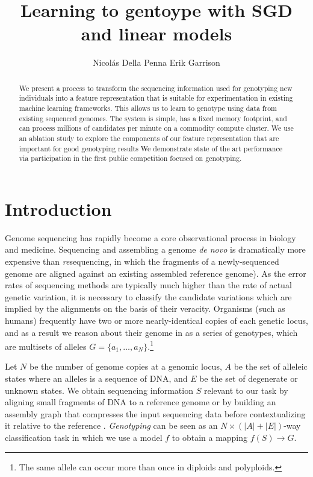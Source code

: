 \documentclass{article}
\title{Learning to gentoype with SGD and linear models}
\author{
Nicol\'as Della Penna
\And
Erik Garrison \\
} %
\begin{document}

\maketitle

\begin{abstract}
  We present a process to transform the sequencing information used for genotyping new individuals into a feature representation that is suitable for experimentation in existing machine learning frameworks.
  This allows us to learn to genotype using data from existing sequenced genomes.
  The system is simple, has a fixed memory footprint, and can process millions of candidates per minute on a commodity compute cluster.
  We use an ablation study to explore the components of our feature representation that are important for good genotyping results
  We demonstrate state of the art performance via participation in the first public competition focused on genotyping.
\end{abstract}

\section{Introduction}



Genome sequencing has rapidly become a core observational process in biology and medicine.
Sequencing and assembling a genome \emph{de novo} is dramatically more expensive than \emph{re}sequencing, in which the fragments of a newly-sequenced genome are aligned against an existing assembled reference genome).
As the error rates of sequencing methods are typically much higher than the rate of actual genetic variation, it is necessary to classify the candidate variations which are implied by the alignments on the basis of their veracity.
Organisms (such as humans) frequently have two or more nearly-identical copies of each genetic locus, and as a result we reason about their genome in as a series of genotypes, which are multisets of alleles $G = \{ a_1, \ldots, a_N \}$.\footnote{The same allele can occur more than once in diploids and polyploids.} 

Let $N$ be the number of genome copies at a genomic locus, $A$ be the set of alleleic states where an alleles is a sequence of DNA, and $E$ be the set of degenerate or unknown states.
We obtain sequencing information $S$ relevant to our task by aligning small fragments of DNA to a reference genome \cite{li2013bwamem} or by building an assembly graph that compresses the input sequencing data before contextualizing it relative to the reference \cite{myers2005, simpson2010, li2015fermikit, iqbal2012}.
\emph{Genotyping} can be seen as an $N \times ( |A| + |E| )$-way classification task in which we use a model $f$ to obtain a mapping $f(S) \to G$.
\end{document}
